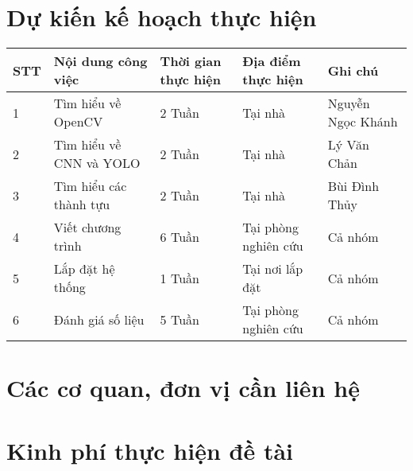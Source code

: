 \documentclass[12pt,twoside,a4paper]{article}
\begin{document}
\section{Dự kiến kế hoạch thực hiện}

\renewcommand{\arraystretch}{2}
\begin{center}
	\begin{tabular}{|p{10mm}|p{48mm}|p{22mm}|p{26mm}|l|} 
		\hline 
		STT & Nội dung công việc & Thời gian thực hiện & Địa điểm thực hiện & Ghi chú \\ 
		\hline
		1 & Tìm hiểu về OpenCV & 2 Tuần & Tại nhà & Nguyễn Ngọc Khánh \\
		\hline
		2 & Tìm hiểu về CNN và YOLO & 2 Tuần & Tại nhà & Lý Văn Chản \\
		\hline
		3 & Tìm hiểu các thành tựu & 2 Tuần & Tại nhà & Bùi Đình Thủy \\
		\hline
		4 & Viết chương trình & 6 Tuần & Tại phòng nghiên cứu & Cả nhóm \\
		\hline
		5 & Lắp đặt hệ thống & 1 Tuần & Tại nơi lắp đặt & Cả nhóm \\
		\hline
		6 & Đánh giá số liệu & 5 Tuần & Tại phòng nghiên cứu & Cả nhóm \\
		\hline
	\end{tabular}
\end{center}
\section{Các cơ quan, đơn vị cần liên hệ}
\section{Kinh phí thực hiện đề tài}
\end{document}
